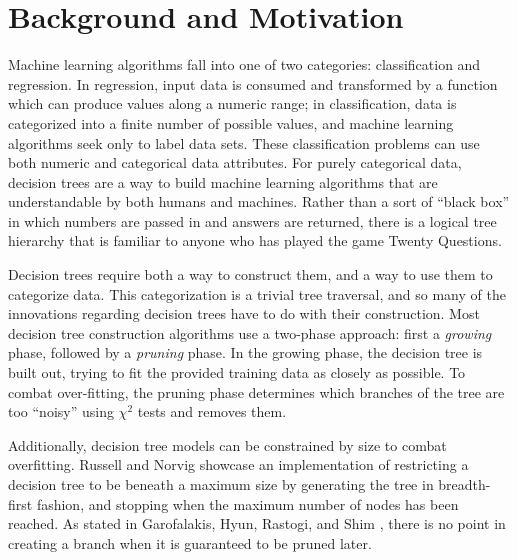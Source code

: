 \documentclass[screen, authorversion, nonacm, sigconf]{acmart}
\begin{document}


\maketitle

\section{Background and Motivation}

Machine learning algorithms fall into one of two categories: classification and regression. In regression, input data is consumed and transformed by a function which can produce values along a numeric range; in classification, data is categorized into a finite number of possible values, and machine learning algorithms seek only to label data sets. These classification problems can use both numeric and categorical data attributes. For purely categorical data, decision trees are a way to build machine learning algorithms that are understandable by both humans and machines. Rather than a sort of ``black box'' in which numbers are passed in and answers are returned, there is a logical tree hierarchy that is familiar to anyone who has played the game Twenty Questions.

Decision trees require both a way to construct them, and a way to use them to categorize data. This categorization is a trivial tree traversal, and so many of the innovations regarding decision trees have to do with their construction. Most decision tree construction algorithms use a two-phase approach: first a \emph{growing} phase, followed by a \emph{pruning} phase. In the growing phase, the decision tree is built out, trying to fit the provided training data as closely as possible. To combat over-fitting, the pruning phase determines which branches of the tree are too ``noisy'' using $\chi^2$ tests and removes them.

Additionally, decision tree models can be constrained by size to combat overfitting. Russell and Norvig \cite{russell_norvig_2010} showcase an implementation of restricting a decision tree to be beneath a maximum size by generating the tree in breadth-first fashion, and stopping when the maximum number of nodes has been reached. As stated in Garofalakis, Hyun, Rastogi, and Shim \cite{Garofalakis:2000:EAC:347090.347163}, there is no point in creating a branch when it is guaranteed to be pruned later.
\end{document}
